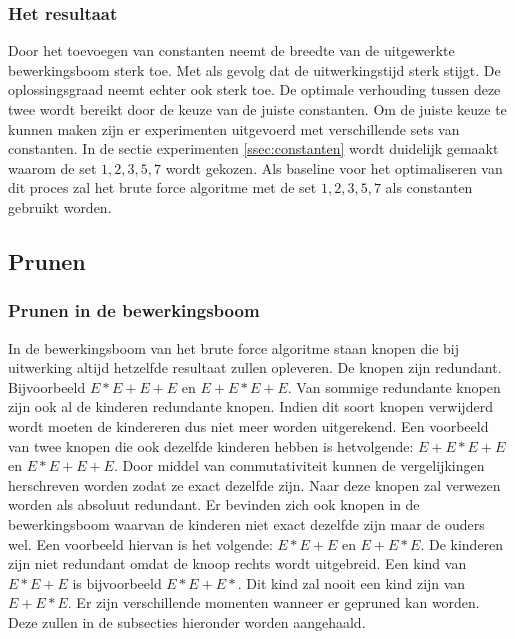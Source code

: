 \documentclass[Main.tex]{subfiles}
\begin{document}
\subsubsection*{Het resultaat}
Door het toevoegen van constanten neemt de breedte van de uitgewerkte bewerkingsboom sterk toe. Met als gevolg dat de uitwerkingstijd sterk stijgt. De oplossingsgraad neemt echter ook sterk toe. De optimale verhouding tussen deze twee wordt bereikt door de keuze van de juiste constanten. Om de juiste keuze te kunnen maken zijn er experimenten uitgevoerd met verschillende sets van constanten. In de sectie experimenten \ref{ssec:constanten}
wordt duidelijk gemaakt waarom de set ${1, 2, 3, 5, 7}$ wordt gekozen. Als baseline voor het optimaliseren van dit proces zal het brute force algoritme met de set ${1, 2, 3, 5, 7}$ als constanten gebruikt worden.

\subsection{Prunen} \label{ssec:Prunen}
\subsubsection*{Prunen in de bewerkingsboom}
In de bewerkingsboom van het brute force algoritme staan knopen die bij uitwerking altijd hetzelfde resultaat zullen opleveren. De knopen zijn redundant. Bijvoorbeeld $E \ast E+E+E$ en $E+E \ast E +E$. Van sommige redundante knopen zijn ook al de kinderen redundante knopen. Indien dit soort knopen verwijderd wordt moeten de kindereren dus niet meer worden uitgerekend. Een voorbeeld van twee knopen die ook dezelfde kinderen hebben is hetvolgende: $E+E \ast E+E$ en $E \ast E+E+E$. Door middel van commutativiteit kunnen de vergelijkingen herschreven worden zodat ze exact dezelfde zijn. Naar deze knopen zal verwezen worden als absoluut redundant. Er bevinden zich ook knopen in de bewerkingsboom waarvan de kinderen niet exact dezelfde zijn maar de ouders wel. Een voorbeeld hiervan is het volgende: $E \ast E+E$ en $E+E \ast E$. De kinderen zijn niet redundant omdat de knoop rechts wordt uitgebreid. Een kind van $E \ast E+E$ is bijvoorbeeld $E \ast E+E \ast$. Dit kind zal nooit een kind zijn van $E+E \ast E$. Er zijn verschillende momenten wanneer er gepruned kan worden. Deze zullen in de subsecties hieronder worden aangehaald.
\end{document}
